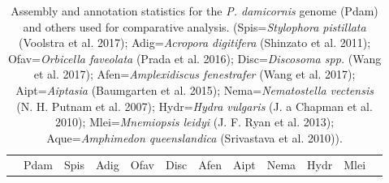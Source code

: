 \documentclass[]{elsarticle} %
\begin{document}
\begin{longtable}[]{@{}llllllllllll@{}}
\caption{Assembly and annotation statistics for the \emph{P. damicornis}
genome (Pdam) and others used for comparative analysis.
(Spis=\emph{Stylophora pistillata} (Voolstra et al. 2017);
Adig=\emph{Acropora digitifera} (Shinzato et al. 2011);
Ofav=\emph{Orbicella faveolata} (Prada et al. 2016);
Disc=\emph{Discosoma spp.} (Wang et al. 2017); Afen=\emph{Amplexidiscus
fenestrafer} (Wang et al. 2017); Aipt=\emph{Aiptasia} (Baumgarten et al.
2015); Nema=\emph{Nematostella vectensis} (N. H. Putnam et al. 2007);
Hydr=\emph{Hydra vulgaris} (J. a Chapman et al. 2010);
Mlei=\emph{Mnemiopsis leidyi} (J. F. Ryan et al. 2013);
Aque=\emph{Amphimedon queenslandica} (Srivastava et al.
2010)).}\tabularnewline
\toprule
\begin{minipage}[b]{0.15\columnwidth}\raggedright\strut
\strut
\end{minipage} & \begin{minipage}[b]{0.05\columnwidth}\raggedright\strut
Pdam\strut
\end{minipage} & \begin{minipage}[b]{0.05\columnwidth}\raggedright\strut
Spis\strut
\end{minipage} & \begin{minipage}[b]{0.05\columnwidth}\raggedright\strut
Adig\strut
\end{minipage} & \begin{minipage}[b]{0.05\columnwidth}\raggedright\strut
Ofav\strut
\end{minipage} & \begin{minipage}[b]{0.05\columnwidth}\raggedright\strut
Disc\strut
\end{minipage} & \begin{minipage}[b]{0.05\columnwidth}\raggedright\strut
Afen\strut
\end{minipage} & \begin{minipage}[b]{0.05\columnwidth}\raggedright\strut
Aipt\strut
\end{minipage} & \begin{minipage}[b]{0.05\columnwidth}\raggedright\strut
Nema\strut
\end{minipage} & \begin{minipage}[b]{0.05\columnwidth}\raggedright\strut
Hydr\strut
\end{minipage} & \begin{minipage}[b]{0.05\columnwidth}\raggedright\strut
Mlei\strut
\end{minipage} & \begin{minipage}[b]{0.05\columnwidth}\raggedright\strut

\end{minipage}
\end{longtable}
\end{document}
